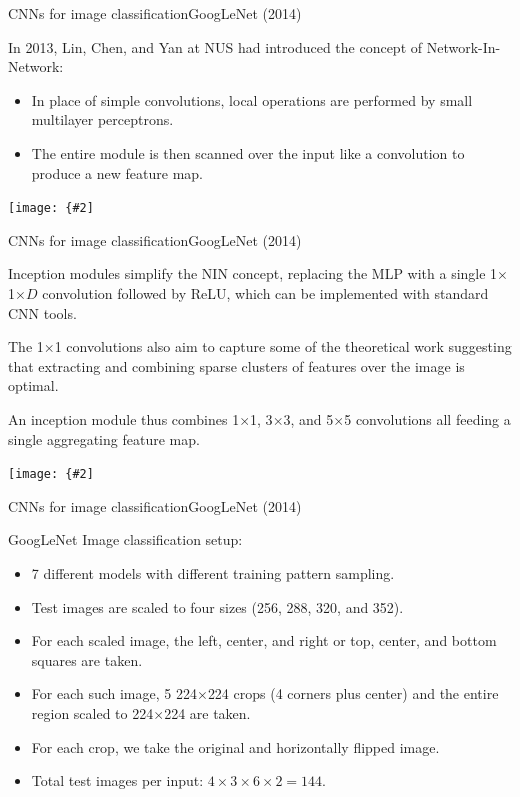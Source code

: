 \documentclass{beamer}
\newcommand{\myfig}[3]{\centerline{\texttt{[image: \{\#2]}}}
\begin{document}
\begin{frame}{CNNs for image classification}{GoogLeNet (2014)}

  In 2013, Lin, Chen, and Yan at NUS had introduced the concept of
  Network-In-Network:
  \begin{itemize}
  \item In place of simple convolutions, local operations are
    performed by small multilayer perceptrons.
  \item The entire module is then scanned over the input like a
    convolution to produce a new feature map.
  \end{itemize}
    
  \medskip
  
  \myfig{3in}{lin-fig1}{Lin, Chen, and Yan (2013), Fig.\ 1}
  
\end{frame}


\begin{frame}{CNNs for image classification}{GoogLeNet (2014)}

  Inception modules simplify the NIN concept, replacing the MLP with a
  single 1$\times$1$\times D$ convolution followed by ReLU, which can
  be implemented with standard CNN tools.
  
  \medskip

  The 1$\times$1 convolutions also aim to capture some of the
  theoretical work suggesting that extracting and combining sparse
  clusters of features over the image is optimal.
  
  \medskip

  An inception module thus combines 1$\times$1, 3$\times$3, and
  5$\times$5 convolutions all feeding a single aggregating feature
  map.

  \medskip

  \myfig{3in}{szegedy-fig2}{Szegedy et al.\ (2014), Fig.\ 2}
  
\end{frame}


\begin{frame}{CNNs for image classification}{GoogLeNet (2014)}

  GoogLeNet Image classification setup:
  \begin{itemize}
  \item 7 different models with different training pattern sampling. 
  \item Test images are scaled to four sizes (256, 288, 320, and 352).
  \item For each scaled image, the left, center, and right or top,
    center, and bottom squares are taken.
  \item For each such image, 5 224$\times$224 crops (4 corners plus center)
    and the entire region scaled to 224$\times$224 are taken.
  \item For each crop, we take the original and horizontally flipped image.
  \item Total test images per input: $4\times 3\times 6\times 2 = 144$.
  \end{itemize}
  
\end{frame}
\end{document}
